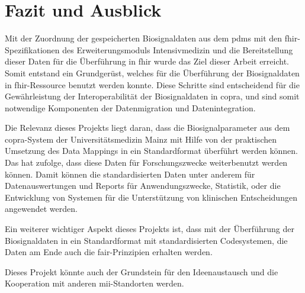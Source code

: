 \chapter{Fazit und Ausblick} \label{ch:conclussion}

Mit der Zuordnung der gespeicherten Biosignaldaten aus dem \ac{pdms} mit den \ac{fhir}-Spezifikationen des Erweiterungsmoduls \glqq Intensivmedizin\grqq{} und die Bereitstellung dieser Daten für die Überführung in \ac{fhir} wurde das Ziel dieser Arbeit erreicht. Somit entstand ein Grundgerüst, welches für die Überführung der Biosignaldaten in \ac{fhir}-Ressource benutzt werden konnte. Diese Schritte sind entscheidend für die Gewährleistung der Interoperabilität der Biosignaldaten in \ac{copra}, und sind somit notwendige Komponenten der Datenmigration und Datenintegration.

Die Relevanz dieses Projekts liegt daran, dass die Biosignalparameter aus dem \ac{copra}-System der Universitätsmedizin Mainz mit Hilfe von der praktischen Umsetzung des Data Mappings in ein Standardformat überführt werden können. Das hat zufolge, dass diese Daten für Forschungszwecke weiterbenutzt werden können. Damit können die standardisierten Daten unter anderem für Datenauswertungen und Reports für Anwendungszwecke, Statistik, oder die Entwicklung von Systemen für die Unterstützung von klinischen Entscheidungen angewendet werden.

Ein weiterer wichtiger Aspekt dieses Projekts ist, dass mit der Überführung der Biosignaldaten in ein Standardformat mit standardisierten Codesystemen, die Daten am Ende auch die \ac{fair}-Prinzipien erhalten werden.

Dieses Projekt könnte auch der Grundstein für den Ideenaustausch und die Kooperation mit anderen \ac{mii}-Standorten werden.
